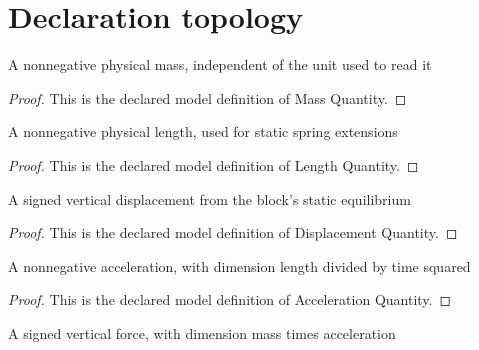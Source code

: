 \section{Declaration topology}
\begin{definition}
  \label{def:physics:phyx-mini-0203:phyxminiproblems-problemphyxmini0203-massquantity}
  A nonnegative physical mass, independent of the unit used to read it
\end{definition}
\begin{proof}
  This is the declared model definition of Mass Quantity.
\end{proof}
\begin{definition}
  \label{def:physics:phyx-mini-0203:phyxminiproblems-problemphyxmini0203-lengthquantity}
  A nonnegative physical length, used for static spring extensions
\end{definition}
\begin{proof}
  This is the declared model definition of Length Quantity.
\end{proof}
\begin{definition}
  \label{def:physics:phyx-mini-0203:phyxminiproblems-problemphyxmini0203-displacementquantity}
  A signed vertical displacement from the block's static equilibrium
\end{definition}
\begin{proof}
  This is the declared model definition of Displacement Quantity.
\end{proof}
\begin{definition}
  \label{def:physics:phyx-mini-0203:phyxminiproblems-problemphyxmini0203-accelerationquantity}
  A nonnegative acceleration, with dimension length divided by time squared
\end{definition}
\begin{proof}
  This is the declared model definition of Acceleration Quantity.
\end{proof}
\begin{definition}
  \label{def:physics:phyx-mini-0203:phyxminiproblems-problemphyxmini0203-forcequantity}
  A signed vertical force, with dimension mass times acceleration
\end{definition}
